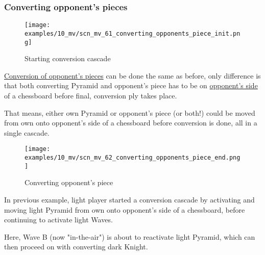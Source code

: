 \subsubsection*{Converting opponent's pieces}
\label{sec:Miranda's veil/Wave/Cascading Waves/Converting opponent's pieces}

\vspace*{-1.4\baselineskip}
\noindent
\begin{figure}[h]
\texttt{[image: examples/10\_mv/scn\_mv\_61\_converting\_opponents\_piece\_init.png]}
\vspace*{-1.3\baselineskip}
\caption{Starting conversion cascade}
\label{fig:scn_mv_61_converting_opponents_piece_init}
\end{figure}

\vspace*{-0.4\baselineskip}
\hyperref[sec:Mayan Ascendancy/Pyramid/Conversion]{Conversion of opponent's pieces}
can be done the same as before, only difference is that both converting Pyramid
and opponent's piece has to be on
\hyperref[sec:Definitions/Chessboard sides, navigation]{opponent's side} of a
chessboard before final, conversion ply takes place.

That means, either own Pyramid or opponent's piece (or both!) could be moved from
own onto opponent's side of a chessboard before conversion is done, all in a single
cascade.

\clearpage %

\vspace*{-2.1\baselineskip}
\noindent
\begin{figure}[h]
\texttt{[image: examples/10\_mv/scn\_mv\_62\_converting\_opponents\_piece\_end.png]}
\vspace*{-1.3\baselineskip}
\caption{Converting opponent's piece}
\label{fig:scn_mv_62_converting_opponents_piece_end}
\end{figure}

\vspace*{-0.4\baselineskip}
In previous example, light player started a conversion cascade by activating and
moving light Pyramid from own onto opponent's side of a chessboard, before
continuing to activate light Waves.

Here, Wave B (now "in-the-air") is about to reactivate light Pyramid, which can
then proceed on with converting dark Knight.

